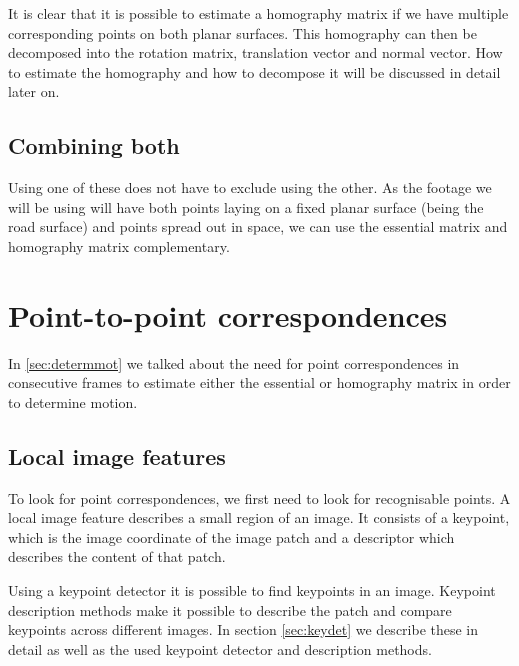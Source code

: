 It is clear that it is possible to estimate a homography matrix if we have multiple corresponding points on both planar surfaces. This homography can then be decomposed into the rotation matrix, translation vector and normal vector. How to estimate the homography and how to decompose it will be discussed in detail later on.

\subsection{Combining both}
Using one of these does not have to exclude using the other. As the footage we will be using will have both points laying on a fixed planar surface (being the road surface) and points spread out in space, we can use the essential matrix and homography matrix complementary.

\section{Point-to-point correspondences}
In \autoref{sec:determmot} we talked about the need for point correspondences in consecutive frames to estimate either the essential or homography matrix in order to determine motion.\bigskip

\subsection{Local image features}
To look for point correspondences, we first need to look for recognisable points. A local image feature describes a small region of an image. It consists of a keypoint, which is the image coordinate of the image patch and a descriptor which describes the content of that patch.\bigskip

Using a keypoint detector it is possible to find keypoints in an image. Keypoint description methods make it possible to describe the patch and compare keypoints across different images. In section \autoref{sec:keydet} we describe these in detail as well as the used keypoint detector and description methods.